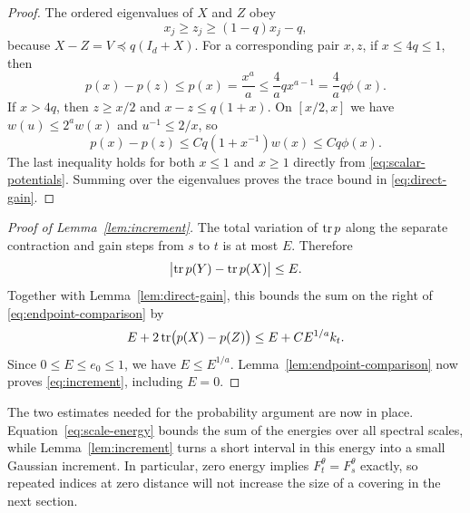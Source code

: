 \begin{proof}
The ordered eigenvalues of $X$ and $Z$ obey
\[
 x_j\ge z_j\ge(1-q)x_j-q,
\]
because $X-Z=V\preceq q(I_d+X)$.  For a corresponding pair $x,z$,
if $x\le4q\le1$, then
\[
 p(x)-p(z)\le p(x)=\frac{x^a}{a}
       \le\frac4a qx^{a-1}=\frac4a q\phi(x).
\]
If $x>4q$, then $z\ge x/2$ and $x-z\le q(1+x)$.
On $[x/2,x]$ we have $w(u)\le2^aw(x)$ and $u^{-1}\le2/x$,
so
\[
 p(x)-p(z)\le Cq(1+x^{-1})w(x)\le Cq\phi(x).
\]
The last inequality holds for both $x\le1$ and $x\ge1$ directly
from \eqref{eq:scalar-potentials}.  Summing over the eigenvalues
proves the trace bound in \eqref{eq:direct-gain}.
\end{proof}

\begin{proof}[Proof of Lemma~\ref{lem:increment}]
The total variation of $\operatorname{tr} p$ along the separate contraction and
gain steps from $s$ to $t$ is at most $E$.  Therefore
\[
 \bigl|\operatorname{tr} p(Y)-\operatorname{tr} p(X)\bigr|\le E.
\]
Together with Lemma~\ref{lem:direct-gain}, this bounds the sum on
the right of \eqref{eq:endpoint-comparison} by
\[
 E+2\operatorname{tr}\bigl(p(X)-p(Z)\bigr)
       \le E+CE^{1/a}k_t.
\]
Since $0\le E\le e_0\le1$, we have $E\le E^{1/a}$.
Lemma~\ref{lem:endpoint-comparison} now proves
\eqref{eq:increment}, including $E=0$.
\end{proof}

The two estimates needed for the probability argument are now in
place.  Equation~\eqref{eq:scale-energy} bounds the sum of the
energies over all spectral scales, while
Lemma~\ref{lem:increment} turns a short interval in this energy into
a small Gaussian increment.  In particular, zero energy implies
$F_t^\theta=F_s^\theta$ exactly, so repeated indices at zero
distance will not increase the size of a covering in the next section.
